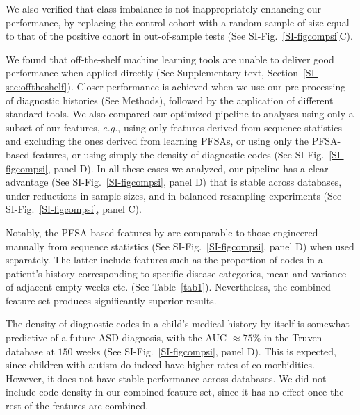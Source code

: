 \documentclass[onecolumn,,10pt]{IEEEtran}
\def\treatment{positive\xspace}
\begin{document}
We also verified that class imbalance is not inappropriately  enhancing our performance, by replacing  the  control cohort with a random sample of size equal to that of the \treatment cohort in out-of-sample tests (See  SI-Fig.~\ref{SI-figcompsi}C).

We found that off-the-shelf machine learning tools are unable to deliver good performance when applied directly (See Supplementary text, Section~\ref{SI-sec:offtheshelf}). Closer performance is achieved  when we use our pre-processing of diagnostic histories (See Methods), followed by the application of  different standard tools. We also compared our optimized pipeline to analyses using only a subset of our features, $e.g.$, using only features derived from sequence statistics and excluding the ones derived from learning PFSAs, or using only the PFSA-based  features, or using simply the density of diagnostic codes (See SI-Fig.~\ref{SI-figcompsi}, panel D). In all these cases we analyzed, our pipeline has a clear advantage (See SI-Fig.~\ref{SI-figcompsi}, panel D) that is stable across databases,  under reductions in sample sizes, and in balanced resampling experiments (See SI-Fig.~\ref{SI-figcompsi}, panel C).

Notably, the PFSA based features by  are comparable to those engineered manually from sequence statistics (See SI-Fig.~\ref{SI-figcompsi}, panel D) when used separately. The latter include  features such as the proportion of  codes in a patient's history corresponding to specific  disease categories, mean and variance of adjacent empty weeks etc. (See Table~\ref{tab1}). Nevertheless,  the combined feature set  produces significantly superior results.

The density of diagnostic codes in a child's medical history by itself is somewhat predictive of a future ASD diagnosis, with the AUC  $\approx 75\%$ in the Truven database at $150$ weeks (See SI-Fig.~\ref{SI-figcompsi}, panel D). This is expected, since children with autism do indeed have higher rates of co-morbidities. However, it does not have stable  performance across databases. We did not include code density in our combined feature set, since it has no effect once the rest of the features are combined.
%
\end{document}
